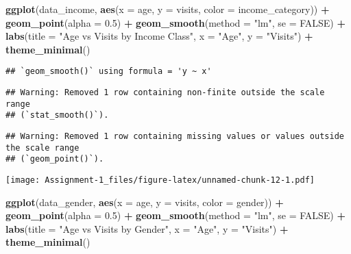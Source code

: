 \documentclass[
]{article}
\newenvironment{Shaded}{\begin{snugshade}}{\end{snugshade}}
\newcommand{\AttributeTok}[1]{\textcolor[rgb]{0.13,0.29,0.53}{#1}}
\newcommand{\ConstantTok}[1]{\textcolor[rgb]{0.56,0.35,0.01}{#1}}
\newcommand{\FloatTok}[1]{\textcolor[rgb]{0.00,0.00,0.81}{#1}}
\newcommand{\FunctionTok}[1]{\textcolor[rgb]{0.13,0.29,0.53}{\textbf{#1}}}
\newcommand{\NormalTok}[1]{#1}
\newcommand{\SpecialCharTok}[1]{\textcolor[rgb]{0.81,0.36,0.00}{\textbf{#1}}}
\newcommand{\StringTok}[1]{\textcolor[rgb]{0.31,0.60,0.02}{#1}}
\begin{document}
\begin{Shaded}
\begin{Highlighting}[]
\FunctionTok{ggplot}\NormalTok{(data\_income, }\FunctionTok{aes}\NormalTok{(}\AttributeTok{x =}\NormalTok{ age, }\AttributeTok{y =}\NormalTok{ visits, }\AttributeTok{color =}\NormalTok{ income\_category)) }\SpecialCharTok{+}
  \FunctionTok{geom\_point}\NormalTok{(}\AttributeTok{alpha =} \FloatTok{0.5}\NormalTok{) }\SpecialCharTok{+}
  \FunctionTok{geom\_smooth}\NormalTok{(}\AttributeTok{method =} \StringTok{"lm"}\NormalTok{, }\AttributeTok{se =} \ConstantTok{FALSE}\NormalTok{) }\SpecialCharTok{+}
  \FunctionTok{labs}\NormalTok{(}\AttributeTok{title =} \StringTok{"Age vs  Visits by Income Class"}\NormalTok{, }
       \AttributeTok{x =} \StringTok{"Age"}\NormalTok{, }
       \AttributeTok{y =} \StringTok{"Visits"}\NormalTok{) }\SpecialCharTok{+}
  \FunctionTok{theme\_minimal}\NormalTok{()}
\end{Highlighting}
\end{Shaded}

\begin{verbatim}
## `geom_smooth()` using formula = 'y ~ x'
\end{verbatim}

\begin{verbatim}
## Warning: Removed 1 row containing non-finite outside the scale range
## (`stat_smooth()`).
\end{verbatim}

\begin{verbatim}
## Warning: Removed 1 row containing missing values or values outside the scale range
## (`geom_point()`).
\end{verbatim}

\texttt{[image: Assignment-1\_files/figure-latex/unnamed-chunk-12-1.pdf]}

\begin{Shaded}
\begin{Highlighting}[]
\FunctionTok{ggplot}\NormalTok{(data\_gender, }\FunctionTok{aes}\NormalTok{(}\AttributeTok{x =}\NormalTok{ age, }\AttributeTok{y =}\NormalTok{ visits, }\AttributeTok{color =}\NormalTok{ gender)) }\SpecialCharTok{+}
  \FunctionTok{geom\_point}\NormalTok{(}\AttributeTok{alpha =} \FloatTok{0.5}\NormalTok{) }\SpecialCharTok{+}
  \FunctionTok{geom\_smooth}\NormalTok{(}\AttributeTok{method =} \StringTok{"lm"}\NormalTok{, }\AttributeTok{se =} \ConstantTok{FALSE}\NormalTok{) }\SpecialCharTok{+}
  \FunctionTok{labs}\NormalTok{(}\AttributeTok{title =} \StringTok{"Age vs Visits by Gender"}\NormalTok{, }
       \AttributeTok{x =} \StringTok{"Age"}\NormalTok{, }
       \AttributeTok{y =} \StringTok{"Visits"}\NormalTok{) }\SpecialCharTok{+}
  \FunctionTok{theme\_minimal}\NormalTok{()}
\end{Highlighting}
\end{Shaded}
\end{document}
